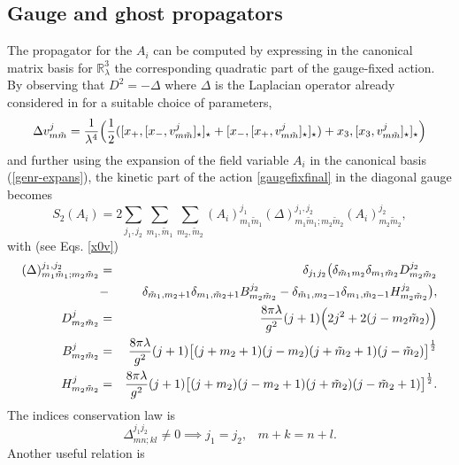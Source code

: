 \documentclass[a4paper,11pt]{article}
\numberwithin{equation}{section}
\newcommand{\eqn}[1]{(\ref{#1})}
\newcommand\Rl{\mathbb{R}^3_\lambda}
\theoremstyle{nonumberplain}
\begin{document}
\subsection{Gauge and ghost propagators}\label{subsection33}

The propagator for the $A_i$ can be computed by expressing in the canonical matrix basis for $\Rl$ the corresponding quadratic part of the gauge-fixed action. By observing that  $
D^2=-\Delta$ where $\Delta$ is the Laplacian operator already considered  in \cite{vit-wal-12} for a suitable choice of parameters, 
\begin{equation}
\Delta v^j_{m\tilde m}= \frac{1}{\lambda^4} \Bigl( \frac{1}{2}( [x_+,[x_-, v^j_{m\tilde m}]_\star]_\star + [x_-,[x_+, v^j_{m\tilde m}]_\star]_\star )+ x_3,[x_3, v^j_{m\tilde m}]_\star]_\star \Bigr)
\end{equation}
and further using the expansion of the field variable $A_i$ in the canonical basis \eqn{genr-expans},
the kinetic part of the action \eqref{gaugefixfinal} in the diagonal gauge becomes
\begin{equation}
S_2(A_i)=2\sum_{j_1,j_2}\sum_{m_1,\tilde m_1}\sum_{m_2,\tilde m_2}(A_i)^{j_1}_{m_1\tilde m_1}(\Delta)^{j_1,j_2}_{m_1\tilde m_1;m_2\tilde m_2}    (A_i)^{j_2}_{m_2 \tilde m_2}\label{quadrat-matrix},
\end{equation}
with (see Eqs. \eqref{x0v})
\begin{eqnarray}
(\Delta)^{j_1,j_2}_{m_1\tilde m_1;m_2\tilde m_2}&=&\delta_{j_1j_2}\big(\delta_{\tilde m_1m_2}\delta_{m_1\tilde m_2}D^{j_2}_{m_2\tilde m_2}\nonumber\\
&-&\delta_{\tilde m_1,m_2+1}\delta_{m_1,\tilde m_2+1}B^{j_2}_{m_2\tilde m_2}-\delta_{\tilde m_1,m_2-1}\delta_{m_1,\tilde m_2-1}H^{j_2}_{m_2\tilde m_2}\big),\\
D^{j}_{m_2\tilde m_2}&=& \frac{8\pi\lambda}{g^2}(j+1) \Bigl(2j^2+2(j-m_2\tilde m_2) \Bigr)\\
B^{j}_{m_2\tilde m_2}&=&\frac{8\pi\lambda}{g^2}(j+1) \big[(j+m_2+1)(j-m_2)(j+\tilde m_2+1)(j-\tilde m_2) \big]^{\frac{1}{2}} \\
H^{j}_{m_2\tilde m_2}&=&\frac{8\pi\lambda}{g^2}(j+1) \big[(j+m_2)(j-m_2+1)(j+\tilde m_2)(j-\tilde m_2+1) \big]^{\frac{1}{2}}.
\end{eqnarray}
The indices conservation law \cite{vit-wal-12} is
\begin{equation}
\Delta^{j_1 j_2}_{mn;kl}\ne 0 \implies
    j_1=j_2,\;\;\;  m+k= n+l\label{consindice1}.
\end{equation}
Another useful relation is
\end{document}
